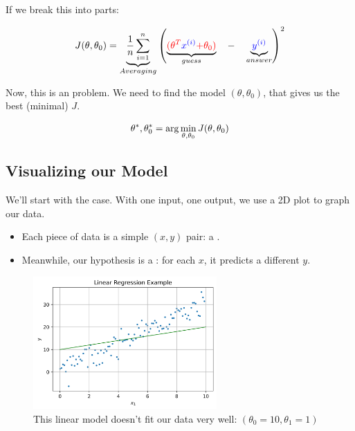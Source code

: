        If we break this into parts:
        
        \begin{equation}
            J(\theta,\theta_0) = 
                        \underbrace{
                            \frac{1}{n}  \sum_{i=1}^n 
                        }_{Averaging}
                        \left( 
                            \underbrace{
                                \textcolor{red}{ (\theta^T} \textcolor{blue}{x^{(i)}} \textcolor{red}{ + \theta_0) } 
                            }_{guess}
                            \quad-\quad 
                            \underbrace{
                                \textcolor{blue}{y^{(i)}}
                            }_{answer}
                        \right)^2 
        \end{equation}
        
        Now, this is an  problem. We need to find the model $(\theta, \theta_0)$, that gives us the best (minimal) $J$.
        
        \begin{equation*}
            \theta^*, \theta_0^* = {\rm arg}\min_{\theta, \theta_0}{J(\theta,\theta_0)}
        \end{equation*}

        \phantom{}
        
    \subsection{Visualizing our Model}
    
        We'll start with the  case. With one input, one output, we use a 2D plot to graph our data.

        \begin{itemize}
            \item Each piece of data is a simple $(x,y)$ pair: a .

            \item Meanwhile, our hypothesis is a : for each $x$, it predicts a different $y$.
        \end{itemize}
        
        \begin{figure}[H]
        \centering
            \includegraphics[width=70mm,scale=0.5]{images/regression_images/Regression_Example_Poor_Fit.png}
        
            \caption*{This linear model doesn't fit our data very well: $(\theta_0=10, \theta_1=1)$}
        \end{figure}

